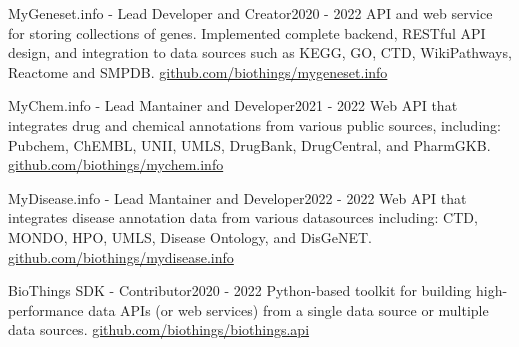 %
%
%


\begin{projects}
	\project
	{MyGeneset.info - Lead Developer and Creator}{2020 - 2022}
	{API and web service for storing collections of genes. Implemented complete backend, RESTful API design, and integration to data sources such as KEGG, GO, CTD, WikiPathways, Reactome and SMPDB.}
	{\href{https://github.com/biothings/mygeneset.info}{github.com/biothings/mygeneset.info}}

	\project
	{MyChem.info - Lead Mantainer and Developer}{2021 - 2022}
	{Web API that integrates drug and chemical annotations from various public sources, including: Pubchem, ChEMBL, UNII, UMLS, DrugBank, DrugCentral, and PharmGKB.}
	{\href{https://github.com/biothings/mychem.info}{github.com/biothings/mychem.info}}

	\project
	{MyDisease.info - Lead Mantainer and Developer}{2022 - 2022}
	{Web API that integrates disease annotation data from various datasources including: CTD, MONDO, HPO, UMLS, Disease Ontology, and DisGeNET.}
	{\href{https://github.com/biothings/mydisease.info}{github.com/biothings/mydisease.info}}

	\project
	{BioThings SDK - Contributor}{2020 - 2022}
	{Python-based toolkit for building high-performance data APIs (or web services) from a single data source or multiple data sources.}
	{\href{https://github.com/biothings/biothings.api}{github.com/biothings/biothings.api}}
\end{projects}